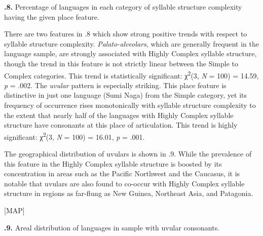 \textbf{.8.} Percentage of languages in each category of syllable structure complexity having the given place feature.

  There are two features in .8 which show strong positive trends with respect to syllable structure complexity. \textit{Palato-alveolars}, which are generally frequent in the language sample, are strongly associated with Highly Complex syllable structure, though the trend in this feature is not strictly linear between the Simple to Complex categories. This trend is statistically significant: χ\textsuperscript{2}(3, \textit{N} = 100) = 14.59, \textit{p} = .002. The \textit{uvular} pattern is especially striking. This place feature is distinctive in just one language (Sumi Naga) from the Simple category, yet its frequency of occurrence rises monotonically with syllable structure complexity to the extent that nearly half of the languages with Highly Complex syllable structure have consonants at this place of articulation. This trend is highly significant: χ\textsuperscript{2}(3, \textit{N} = 100) = 16.01, \textit{p} = .001. 

  The geographical distribution of uvulars is shown in .9. While the prevalence of this feature in the Highly Complex syllable structure is boosted by its concentration in areas such as the Pacific Northwest and the Caucasus, it is notable that uvulars are also found to co-occur with Highly Complex syllable structure in regions as far-flung as New Guinea, Northeast Asia, and Patagonia.

[MAP]

\textbf{.9.} Areal distribution of languages in sample with uvular consonants.

